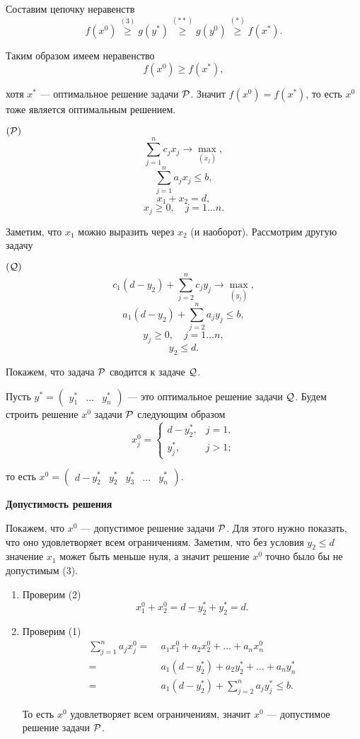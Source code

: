 Составим цепочку неравенств
\[
f(x^0) \stackrel{(3)}{\ge} g(y^*) \stackrel{(**)}{\ge} g(y^0) \stackrel{(*)}{\ge} f(x^*).
\]

Таким образом имеем неравенство
\[
f(x^0) \ge f(x^*),
\]

хотя $x^*$ --- оптимальное решение задачи $\P$. Значит $f(x^0) = f(x^*)$, то есть $x^0$ тоже является оптимальным решением.

\example\label{ex:reduction_to_other_problem}

$(\P)$
\[\sum_{j=1}^{n} c_j x_j \to \max_{(x_j)},\]
\[\sum_{j=1}^{n} a_j x_j \le b \tag{1},\]
\[x_1 + x_2 = d \tag{2},\]
\[x_j \ge 0, \quad j = 1\dots n. \tag{3}\]

Заметим, что $x_1$ можно выразить через $x_2$ (и наоборот). Рассмотрим другую задачу

$(\Q)$
\[c_1(d - y_2) + \sum_{j=2}^{n} c_j y_j \to \max_{(y_j)},\]
\[a_1 (d-y_2) + \sum_{j=2}^{n}a_j y_j \le b,\]
\[y_j \ge 0, \quad j = 1\dots n,\]
\[y_2 \le d.\]

Покажем, что задача $\P$ сводится к задаче $\Q$.

\prooof

Пусть $y^* = \begin{pmatrix} y^*_1 & \dots & y^*_n \end{pmatrix}$ --- это оптимальное решение задачи $\Q$. Будем строить решение $x^0$ задачи $\P$ следующим образом
\[
x^0_j = \begin{cases}
	d - y_2^*,& j = 1, \\
	y_j^*,& j > 1;
\end{cases}
\]

то есть $x^0 = \begin{pmatrix} d - y_2^* & y_2^* & y_3^* & \dots & y_n^* \end{pmatrix}$.

\bigskip

\textbf{Допустимость решения}

Покажем, что $x^0$ --- допустимое решение задачи $\P$. Для этого нужно показать, что оно удовлетворяет всем ограничениям. Заметим, что без условия $y_2 \le d$ значение $x_1$ может быть меньше нуля, а значит решение $x^0$ точно было бы не допустимым (3).

\begin{enumerate}[nosep]
	\item Проверим (2)
	\[
	x^0_1 + x^0_2 = d - y^*_2 + y^*_2 = d.
	\]
	
	\item Проверим (1)
	\begin{align*}
		\sum_{j=1}^{n} a_j x^0_j =& \; a_1 x^0_1 + a_2 x^0_2 + \dots + a_n x^0_n \\
		=& \; a_1 (d - y^*_2) + a_2 y^*_2 + \dots + a_n y^*_n \\
		=& \; a_1 (d-y^*_2) + \sum_{j=2}^{n}a_j y^*_j \le b.
	\end{align*}
	
	То есть $x^0$ удовлетворяет всем ограничениям, значит $x^0$ --- допустимое решение задачи $\P$.
\end{enumerate}

